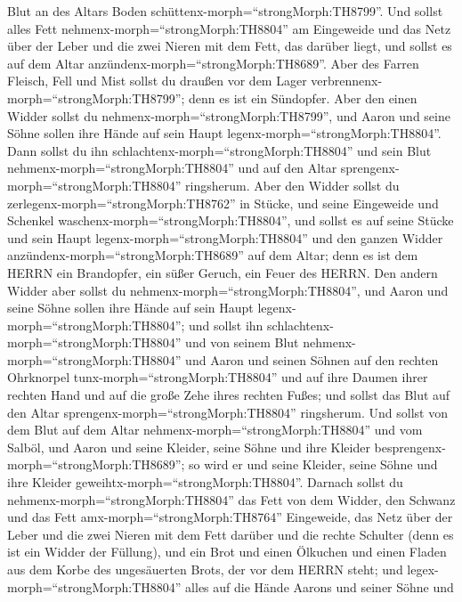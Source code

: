 Blut an des Altars Boden schüttenx-morph=``strongMorph:TH8799''.
 Und sollst alles Fett nehmenx-morph=``strongMorph:TH8804''
am Eingeweide und das Netz über der Leber und die zwei Nieren mit dem
Fett, das darüber liegt, und sollst es auf dem Altar
anzündenx-morph=``strongMorph:TH8689''.  Aber des Farren
Fleisch, Fell und Mist sollst du draußen vor dem Lager
verbrennenx-morph=``strongMorph:TH8799''; denn es ist ein Sündopfer.
 Aber den einen Widder sollst du
nehmenx-morph=``strongMorph:TH8799'', und Aaron und seine Söhne sollen
ihre Hände auf sein Haupt legenx-morph=``strongMorph:TH8804''.
 Dann sollst du ihn
schlachtenx-morph=``strongMorph:TH8804'' und sein Blut
nehmenx-morph=``strongMorph:TH8804'' und auf den Altar
sprengenx-morph=``strongMorph:TH8804'' ringsherum.  Aber
den Widder sollst du zerlegenx-morph=``strongMorph:TH8762'' in Stücke,
und seine Eingeweide und Schenkel waschenx-morph=``strongMorph:TH8804'',
und sollst es auf seine Stücke und sein Haupt
legenx-morph=``strongMorph:TH8804''  und den ganzen Widder
anzündenx-morph=``strongMorph:TH8689'' auf dem Altar; denn es ist dem
HERRN ein Brandopfer, ein süßer Geruch, ein Feuer des HERRN.
 Den andern Widder aber sollst du
nehmenx-morph=``strongMorph:TH8804'', und Aaron und seine Söhne sollen
ihre Hände auf sein Haupt legenx-morph=``strongMorph:TH8804'';
 und sollst ihn schlachtenx-morph=``strongMorph:TH8804''
und von seinem Blut nehmenx-morph=``strongMorph:TH8804'' und Aaron und
seinen Söhnen auf den rechten Ohrknorpel
tunx-morph=``strongMorph:TH8804'' und auf ihre Daumen ihrer rechten Hand
und auf die große Zehe ihres rechten Fußes; und sollst das Blut auf den
Altar sprengenx-morph=``strongMorph:TH8804'' ringsherum. 
Und sollst von dem Blut auf dem Altar
nehmenx-morph=``strongMorph:TH8804'' und vom Salböl, und Aaron und seine
Kleider, seine Söhne und ihre Kleider
besprengenx-morph=``strongMorph:TH8689''; so wird er und seine Kleider,
seine Söhne und ihre Kleider geweihtx-morph=``strongMorph:TH8804''.
 Darnach sollst du nehmenx-morph=``strongMorph:TH8804'' das
Fett von dem Widder, den Schwanz und das Fett
amx-morph=``strongMorph:TH8764'' Eingeweide, das Netz über der Leber und
die zwei Nieren mit dem Fett darüber und die rechte Schulter (denn es
ist ein Widder der Füllung),  und ein Brot und einen
Ölkuchen und einen Fladen aus dem Korbe des ungesäuerten Brots, der vor
dem HERRN steht;  und legex-morph=``strongMorph:TH8804''
alles auf die Hände Aarons und seiner Söhne und
